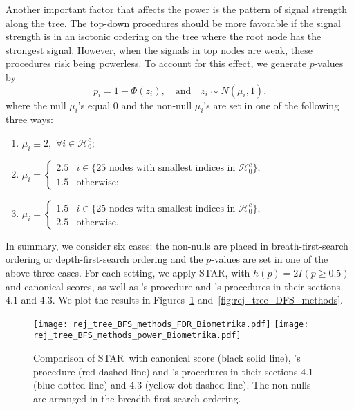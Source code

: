 \documentclass{biometrika}
\newcommand{\cH}{\mathcal{H}}
\renewcommand{\star}{STAR}
\newcommand{\1}{\mathbf{1}}
\begin{document}
Another important factor that affects the power is the pattern of signal strength along the tree. The top-down procedures should be more favorable if the signal strength is in an isotonic ordering on the tree where the root node has the strongest signal. However, when the signals in top nodes are weak, these procedures risk being powerless. To account for this effect, we generate $p$-values by 
\begin{equation}\label{eq:simul_pvals}
p_{i} = 1 - \Phi(z_{i}), \quad \mbox{and} \quad z_{i}\sim N(\mu_{i}, 1).
\end{equation}
where the null $\mu_{i}$'s  equal  0 and the non-null $\mu_{i}$'s are set in one of the following three ways:
\begin{enumerate}[{Case} 1:]
\item $\mu_{i}\equiv 2, \,\, \forall i\in \cH_{0}^{c}$;
\item  $\displaystyle \mu_{i} = \left\{\begin{array}{ll}
2.5 & i\in \{25 \mbox{ nodes with smallest indices in }\cH_{0}^{c}\},\\
1.5 & \mbox{otherwise;}
\end{array}\right.$
\item $\displaystyle \mu_{i} = \left\{\begin{array}{ll}
1.5 & i\in \{25 \mbox{ nodes with smallest indices in }\cH_{0}^{c}\},\\
2.5 & \mbox{otherwise.}
\end{array}\right.$
\end{enumerate}

In summary, we consider six cases: the non-nulls are placed in breath-first-search ordering or depth-first-search ordering and the $p$-values are set in one of the above three cases. For each setting, we apply \star, with $h(p) = 2I(p\ge 0.5)$ and canonical scores, as well as \cite{yekutieli08}'s procedure and \cite{lynch16}'s procedures in their sections 4.1 and 4.3. We plot the results in Figures~\ref{fig:rej_tree_BFS_methods} and~\ref{fig:rej_tree_DFS_methods}. 

\begin{figure}[h!]
  \centering
  \texttt{[image: rej\_tree\_BFS\_methods\_FDR\_Biometrika.pdf]}
  \texttt{[image: rej\_tree\_BFS\_methods\_power\_Biometrika.pdf]}
  \caption{Comparison of \star ~with canonical score (black solid line), \cite{yekutieli08}'s procedure (red dashed line) and \cite{lynch16}'s procedures in their sections 4.1 (blue dotted line) and 4.3 (yellow dot-dashed line). The non-nulls are arranged in the breadth-first-search ordering.}\label{fig:rej_tree_BFS_methods}
\end{figure}
\end{document}
